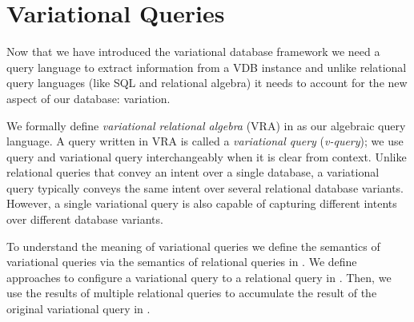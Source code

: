 \chapter{Variational Queries}
\label{ch:vql}

Now that we have introduced the variational database framework 
we need a query language to extract information from a VDB instance
and unlike relational query languages (like SQL and relational algebra)
it needs to account for the new aspect of our database: variation. 


We formally define 
\emph{variational relational algebra} (VRA) in 
as our algebraic query language.
A query written in VRA is called a \emph{variational query} (\emph{v-query});
we use query and variational query interchangeably when it is clear from context. 
Unlike relational queries that convey an intent over a single database, 
a variational query typically conveys the same intent over several 
relational database variants. However, a single variational query is also capable of capturing different 
intents over different database variants.

To understand the meaning of variational queries
we define the semantics of variational queries via the
semantics of relational queries in . We define
approaches to configure a variational query to a relational query
in . Then, we use the results of multiple relational
queries to accumulate the result of the original variational query 
in .

